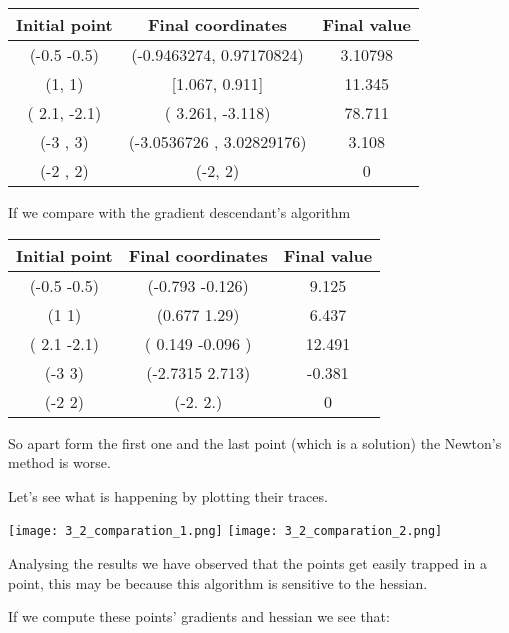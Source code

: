 \begin{center}
  \begin{tabular}{ |c|c|c| }
    \hline
    Initial point  & Final coordinates & Final value  \\ 
    \hline

    (-0.5 -0.5) & (-0.9463274,  0.97170824)  &  3.10798 \\
    (1, 1)    & [1.067, 0.911] &  11.345 \\
( 2.1, -2.1)   &  ( 3.261, -3.118)  & 78.711 \\
    (-3 , 3)  &  (-3.0536726 ,  3.02829176) &   3.108\\
(-2 , 2)  &  (-2,  2) &  0 \\
 
 \hline
\end{tabular}
\end{center}

If we compare with the gradient descendant's algorithm

\begin{center}
  \begin{tabular}{ |c|c|c| }
    \hline
    Initial point  & Final coordinates & Final value  \\ 
    \hline

    (-0.5 -0.5) &  (-0.793 -0.126) &   9.125 \\
(1 1) &  (0.677 1.29) &   6.437 \\
( 2.1 -2.1) &  ( 0.149 -0.096 ) &   12.491 \\
(-3  3) &  (-2.7315  2.713) &  -0.381 \\
(-2  2) &  (-2.  2.) &  0 \\
    
 
 \hline
\end{tabular}
\end{center}



So apart form the first one and the last point (which is a solution) the Newton's method is worse.

Let's see what is happening by plotting their traces. 

\texttt{[image: 3\_2\_comparation\_1.png]}
\texttt{[image: 3\_2\_comparation\_2.png]}


Analysing the results we have observed that the points get easily trapped in a point, this may be because this algorithm is sensitive to the hessian.


If we compute these points' gradients and hessian we see that:

